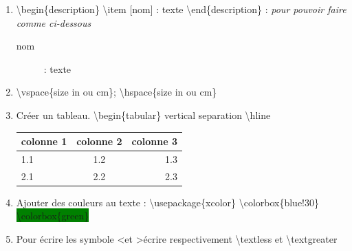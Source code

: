 \documentclass[12pt, letterpaper]{article}
\begin{document}
\begin{enumerate}
\item \textbackslash begin\{description\} \textbackslash item [nom] : texte \textbackslash end\{description\} : \textit{pour pouvoir faire comme ci-dessous}
\begin{description}
\item [nom] : texte
\end{description}
\item \textbackslash vspace\{size in ou cm\}; \textbackslash hspace\{size in ou cm\}
\item Créer un tableau. \textbackslash begin\{tabular\} vertical separation \textbackslash hline
\newline \begin{tabular}{|l|c|r|}
  \hline
  colonne 1 & colonne 2 & colonne 3 \\
  \hline
  1.1 & 1.2 & 1.3 \\ \hline
  2.1 & 2.2 & 2.3 \\
  \hline
\end{tabular}
\item Ajouter des couleurs au texte : \textbackslash usepackage\{xcolor\}
\newline \colorbox{blue!30}{\textbackslash colorbox\{blue!30\}}
\newline \colorbox{green}{\textbackslash colorbox\{green\}}
\item Pour écrire les symbole \textless et \textgreater écrire respectivement \textbackslash textless et \textbackslash textgreater

\end{enumerate}
\end{document}
